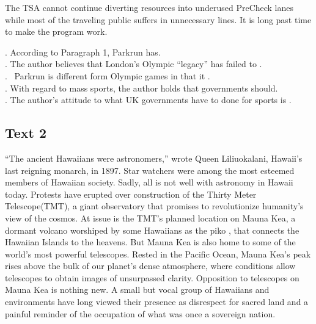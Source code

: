 The TSA cannot continue diverting resources into underused PreCheck lanes while most of the traveling public suffers in unnecessary lines. It is long past time to make the program work. 
\begin{questions} . According to Paragraph 1, Parkrun has\ltk{}. 
\\ . The author believes that London’s Olympic “legacy” has failed to \ltk{}. 
\\ .  Parkrun is different form Olympic games in that it \ltk{}. 
\\ . With regard to mass sports, the author holds that governments should\ltk{}. 
\\ . The author’s attitude to what UK governments have to done for sports is \ltk{}. 
\\ \end{questions}      \subsection{Text 2} 
“The ancient Hawaiians were astronomers,” wrote Queen Liliuokalani, Hawaii’s last reigning monarch, in 1897. Star watchers were among the most esteemed members of Hawaiian society. Sadly, all is not well with astronomy in Hawaii today. Protests have erupted over construction of the Thirty Meter Telescope(TMT), a giant observatory that promises to revolutionize humanity’s view of the cosmos. 
At issue is the TMT’s planned location on Mauna Kea, a dormant volcano worshiped by some Hawaiians as the piko , that connects the Hawaiian Islands to the heavens. But Mauna Kea is also home to some of the world’s most powerful telescopes. Rested in the Pacific Ocean, Mauna Kea’s peak rises above the bulk of our planet’s dense atmosphere, where conditions allow telescopes to obtain images of unsurpassed clarity. 
Opposition to telescopes on Mauna Kea is nothing new. A small but vocal group of Hawaiians and environments have long viewed their presence as disrespect for sacred land and a painful reminder of the occupation of what was once a sovereign nation. 
